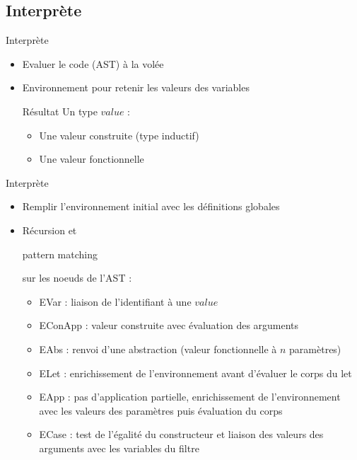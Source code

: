 \subsection{Interprète}

\begin{frame}{Interprète}
  \begin{itemize}
  \item Evaluer le code (AST) à la volée
  \item Environnement pour retenir les valeurs des variables
    \begin{block}{Résultat}
      Un type $value$ :
      \begin{itemize}
        \item Une valeur construite (type inductif)
        \item Une valeur fonctionnelle
      \end{itemize}
    \end{block}
  \end{itemize}
\end{frame}

\begin{frame}{Interprète}
  \begin{itemize}
  \item Remplir l'environnement initial avec les définitions globales
  \item Récursion et \begin{it}pattern matching\end{it} sur les
    noeuds de l'AST :
    \begin{itemize}
    \item EVar : liaison de l'identifiant à une $value$
    \item EConApp : valeur construite avec évaluation des arguments
    \item EAbs : renvoi d'une abstraction (valeur fonctionnelle à $n$
      paramètres)
    \item ELet : enrichissement de l'environnement avant d'évaluer le
      corps du let
    \item EApp : pas d'application partielle, enrichissement de
      l'environnement avec les valeurs des paramètres puis évaluation
      du corps
    \item ECase : test de l'égalité du constructeur et liaison des
      valeurs des arguments avec les variables du filtre
    \end{itemize}
  \end{itemize}
\end{frame}

